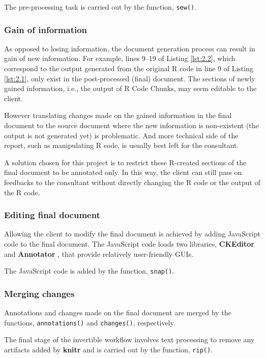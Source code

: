 \documentclass[a4paper, 12pt]{report}
\begin{document}
The pre-processing task is carried out by the function, \texttt{sew()}.

\subsubsection*{Gain of information}
As opposed to losing information, the document generation process can result in gain of new information. For example, lines 9--19 of Listing \ref{lst:2.2}, which correspond to the output generated from the original R code in line 9 of Listing \ref{lst:2.1}, only exist in the post-processed (final) document. The sections of newly gained information, i.e., the output of R Code Chunks, may seem editable to the client.

However translating changes made on the gained information in the final document to the source document where the new information is non-existent (the output is not generated yet) is problematic. And more technical side of the report, such as manipulating R code, is usually best left for the consultant.

A solution chosen for this project is to restrict these R-created sections of the final document to be annotated only. In this way, the client can still pass on feedbacks to the consultant without directly changing the R code or the output of the R code.

\subsubsection*{Editing final document}
Allowing the client to modify the final document is achieved by adding JavaScript code to the final document. The JavaScript code loads two libraries, \textbf{CKEditor} \citep{ckeditor} and \textbf{Annotator} \citep{annotator}, that provide relatively user-friendly GUIs.

The JavaScript code is added by the function, \texttt{snap()}.

\subsubsection*{Merging changes}
Annotations and changes made on the final document are merged by the functions, \texttt{annotations()} and \texttt{changes()}, respectively.

The final stage of the invertible workflow involves text processing to remove any artifacts added by \textbf{knitr} and is carried out by the function, \texttt{rip()}.
\end{document}
